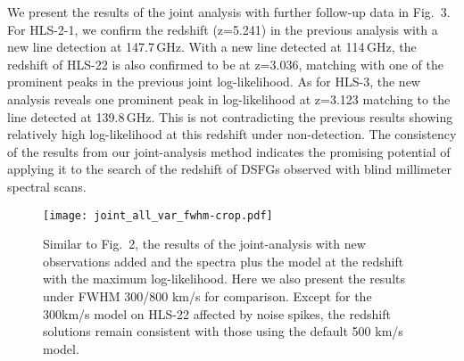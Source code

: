 \documentclass{webofc}
\begin{document}
We present the results of the joint analysis with further follow-up data in Fig.~3. For HLS-2-1, we confirm the redshift (z=5.241) in the previous analysis with a new line detection at 147.7\,GHz. With a new line detected at 114\,GHz, the redshift of HLS-22 is also confirmed to be at z=3.036, matching with one of the prominent peaks in the previous joint log-likelihood. As for HLS-3, the new analysis reveals one prominent peak in log-likelihood at z=3.123 matching to the line detected at 139.8\,GHz. This is not contradicting the previous results showing relatively high log-likelihood at this redshift under non-detection. %
The consistency of the results from our joint-analysis method indicates the promising potential of applying it to the search of the redshift of DSFGs observed with blind millimeter spectral scans.

\begin{figure}[h]
\begin{center}
\texttt{[image: joint\_all\_var\_fwhm-crop.pdf]}
\label{joint2}       %
\caption{Similar to Fig.~2, the results of the joint-analysis with new observations added and the spectra plus the model at the redshift with the maximum log-likelihood. Here we also present the results under FWHM 300/800 km/s for comparison. Except for the 300km/s model on HLS-22 affected by noise spikes, the redshift solutions remain consistent with those using the default 500 km/s model.}
\end{center}
\end{figure}




\end{document}
